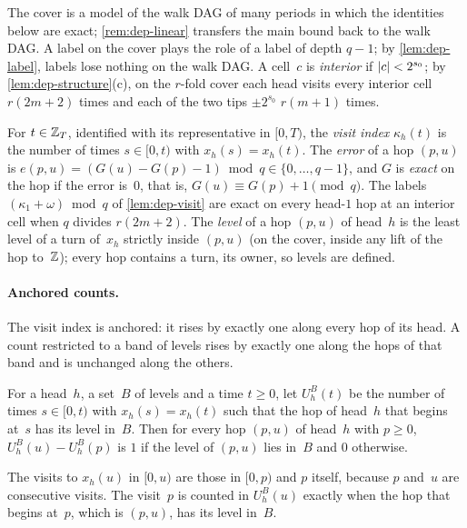 The cover is a model of the walk
DAG of many periods in which the identities below are exact; \cref{rem:dep-linear} transfers the main bound back to
the walk DAG. A label on the cover plays the role of a label of depth $q-1$; by \cref{lem:dep-label}, labels lose
nothing on the walk DAG. A cell~$c$ is \emph{interior} if $\lvert c \rvert<2^{s_0}$; by \cref{lem:dep-structure}(c), on the
$r$-fold cover each head visits every interior cell $r(2m+2)$ times and each of the two tips $\pm2^{s_0}$ $r(m+1)$
times.

For $t\in\mathbb{Z}_T$, identified with its representative in $[0,T)$, the \emph{visit index} $\kappa_h(t)$ is the number of
times $s\in[0,t)$ with $x_h(s)=x_h(t)$. The \emph{error} of a hop $(p,u)$ is
$e(p,u)=(G(u)-G(p)-1)\bmod q\in\{0,\dots,q-1\}$, and $G$ is \emph{exact} on the hop if the error is~$0$, that is,
$G(u)\equiv G(p)+1\pmod q$. The labels $(\kappa_1+\omega)\bmod q$ of \cref{lem:dep-visit} are exact on every head-$1$
hop at an interior cell when $q$ divides $r(2m+2)$. The \emph{level} of a hop $(p,u)$ of head~$h$ is the least level
of a turn of~$x_h$ strictly inside $(p,u)$ (on the cover, inside any lift of the hop to~$\mathbb{Z}$); every hop contains a
turn, its owner, so levels are defined.

\paragraph{Anchored counts.} The visit index is anchored: it rises by exactly one along every hop of its head. A
count restricted to a band of levels rises by exactly one along the hops of that band and is unchanged along the
others.

\begin{lemma}\label{lem:dep-band}
\notformalized
For a head~$h$, a set~$B$ of levels and a time $t\ge0$, let $U_h^B(t)$ be the number of times $s\in[0,t)$ with
$x_h(s)=x_h(t)$ such that the hop of head~$h$ that begins at~$s$ has its level in~$B$. Then for every hop $(p,u)$ of
head~$h$ with $p\ge0$, $U_h^B(u)-U_h^B(p)$ is $1$ if the level of $(p,u)$ lies in~$B$ and $0$ otherwise.
\end{lemma}

\begin{informalproof}
The visits to $x_h(u)$ in $[0,u)$ are those in $[0,p)$ and $p$ itself, because $p$ and~$u$ are consecutive visits.
The visit~$p$ is counted in $U_h^B(u)$ exactly when the hop that begins at~$p$, which is $(p,u)$, has its level in~$B$.
\end{informalproof}

